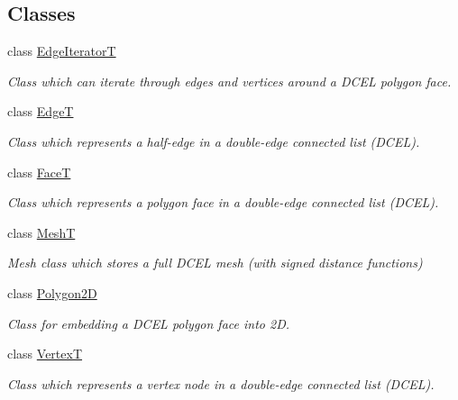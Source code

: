 \subsection*{Classes}
\begin{DoxyCompactItemize}
\item 
class \hyperlink{classDcel_1_1EdgeIteratorT}{Edge\+IteratorT}
\begin{DoxyCompactList}\small\item\em Class which can iterate through edges and vertices around a D\+C\+EL polygon face. \end{DoxyCompactList}\item 
class \hyperlink{classDcel_1_1EdgeT}{EdgeT}
\begin{DoxyCompactList}\small\item\em Class which represents a half-\/edge in a double-\/edge connected list (D\+C\+EL). \end{DoxyCompactList}\item 
class \hyperlink{classDcel_1_1FaceT}{FaceT}
\begin{DoxyCompactList}\small\item\em Class which represents a polygon face in a double-\/edge connected list (D\+C\+EL). \end{DoxyCompactList}\item 
class \hyperlink{classDcel_1_1MeshT}{MeshT}
\begin{DoxyCompactList}\small\item\em Mesh class which stores a full D\+C\+EL mesh (with signed distance functions) \end{DoxyCompactList}\item 
class \hyperlink{classDcel_1_1Polygon2D}{Polygon2D}
\begin{DoxyCompactList}\small\item\em Class for embedding a D\+C\+EL polygon face into 2D. \end{DoxyCompactList}\item 
class \hyperlink{classDcel_1_1VertexT}{VertexT}
\begin{DoxyCompactList}\small\item\em Class which represents a vertex node in a double-\/edge connected list (D\+C\+EL). \end{DoxyCompactList}\end{DoxyCompactItemize}
